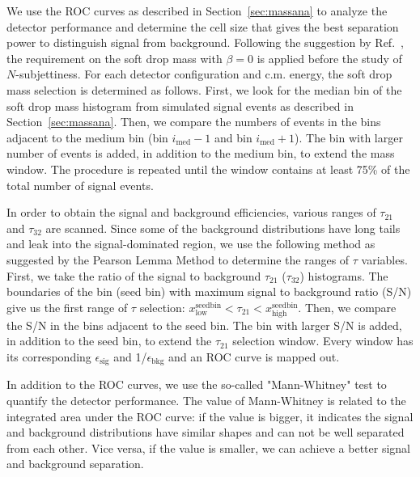 We use the ROC curves as described in Section~\ref{sec:massana} to 
analyze the detector performance and determine the cell size that gives the 
best separation power to distinguish signal from background. 
Following the suggestion by Ref.~\cite{Dreyer:2018tjj}, the requirement on the 
soft drop mass with $\beta=0$ is applied before the study of $N$-subjettiness. 
For each detector configuration and c.m. energy, the soft drop mass selection 
is determined as follows. First, we look for the median bin of the soft drop 
mass histogram from simulated signal events as described in 
Section~\ref{sec:massana}.  Then, we compare the numbers of events in the 
bins adjacent to the medium bin (bin $i_\mathrm{med}-1$ 
and bin $i_\mathrm{med}+1$). The bin with larger number of events is added, 
in addition to the medium bin, to extend the mass window. The procedure is 
repeated until the window contains at least 75\% of the total number of signal 
events. 

In order to obtain the signal and background efficiencies, 
various ranges of $\tau_{21}$ and $\tau_{32}$ are scanned. 
Since some of the background distributions have long tails and leak into the 
signal-dominated region, we use the following method as suggested by the 
Pearson Lemma Method to determine the ranges of $\tau$ variables. 
First, we take the ratio of the signal to background $\tau_{21}$ ($\tau_{32}$) 
histograms. The boundaries of the bin (seed bin) with maximum signal to 
background ratio (S/N) give us the first range of $\tau$ selection: 
$x_\mathrm{low}^\mathrm{seedbin} < \tau_{21} <  x_\mathrm{high}^\mathrm{seedbin}$. 
Then, we compare the S/N in the bins adjacent to the seed bin. The bin with 
larger S/N is added, in addition to the seed bin, to extend the $\tau_{21}$ 
selection window. 
Every window has its corresponding $\epsilon_\mathrm{sig}$ and 
1/$\epsilon_\mathrm{bkg}$ and an ROC curve is mapped out. 

In addition to the ROC curves, we use the so-called "Mann-Whitney" test to 
quantify the detector performance. 
The value of Mann-Whitney is related to the integrated area under the ROC 
curve: if the value is bigger, it indicates the signal and background
 distributions have similar shapes and can not be well separated from 
each other. Vice versa, if the value is smaller, we can achieve a better 
signal and background separation. 

